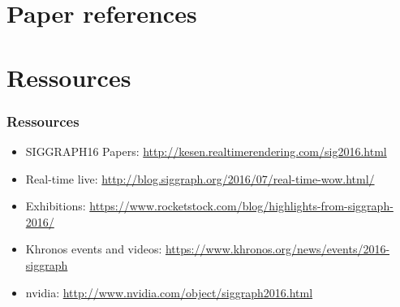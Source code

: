 \section{Paper references}
\section{Ressources}
\frame
{
	\frametitle{Ressources}
	\begin{itemize}
		\item SIGGRAPH16 Papers: \url{http://kesen.realtimerendering.com/sig2016.html}
		\item Real-time live:  \url{http://blog.siggraph.org/2016/07/real-time-wow.html/}
		\item Exhibitions:  \url{https://www.rocketstock.com/blog/highlights-from-siggraph-2016/}
		\item Khronos events and videos:  \url{https://www.khronos.org/news/events/2016-siggraph}
		\item nvidia:  \url{http://www.nvidia.com/object/siggraph2016.html}
	\end{itemize}
}